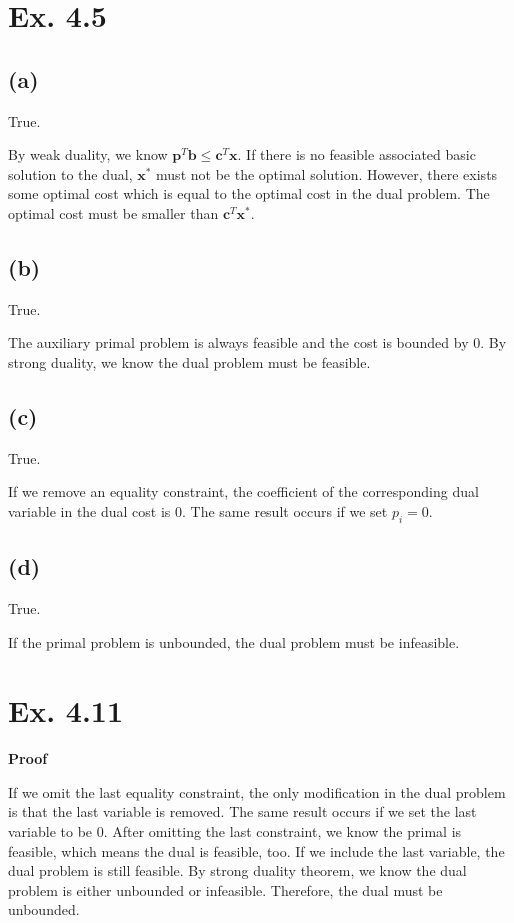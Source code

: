 \documentclass[12pt]{article}
\begin{document}
\section*{Ex. 4.5}
\subsection*{(a)}
True.

By weak duality, we know $\bm{p}^T\bm{b}\le\bm{c}^T\bm{x}$. If there is no feasible associated basic solution to the dual, $\bm{x}^*$ must not be the optimal solution. However, there exists some optimal cost which is equal to the optimal cost in the dual problem. The optimal cost must be smaller than $\bm{c}^T\bm{x}^*$.

\subsection*{(b)}
True.

The auxiliary primal problem is always feasible and the cost is bounded by 0. By strong duality, we know the dual problem must be feasible.

\subsection*{(c)}
True.

If we remove an equality constraint, the coefficient of the corresponding dual variable in the dual cost is 0. The same result occurs if we set $p_i=0$.

\subsection*{(d)}
True.

If the primal problem is unbounded, the dual problem must be infeasible.

\section*{Ex. 4.11}
\textbf{Proof}

If we omit the last equality constraint, the only modification in the dual problem is that the last variable is removed. The same result occurs if we set the last variable to be 0. After omitting the last constraint, we know the primal is feasible, which means the dual is feasible, too. If we include the last variable, the dual problem is still feasible. By strong duality theorem, we know the dual problem is either unbounded or infeasible. Therefore, the dual must be unbounded.
\end{document}
